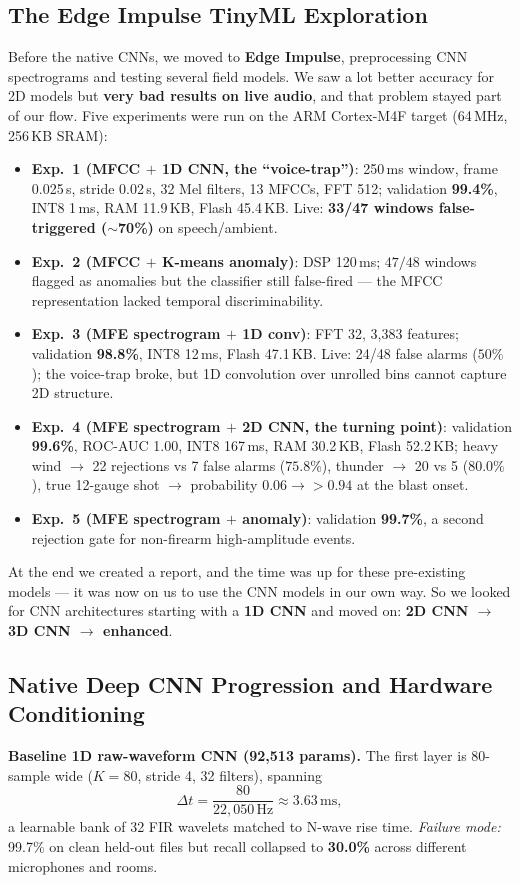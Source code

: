 \documentclass[conference]{IEEEtran}
\begin{document}
\subsection{The Edge Impulse TinyML Exploration}
Before the native CNNs, we moved to \textbf{Edge Impulse}, preprocessing CNN spectrograms and testing
several field models. We saw a lot better accuracy for 2D models but \textbf{very bad results on live
audio}, and that problem stayed part of our flow. Five experiments were run on the ARM Cortex-M4F target
(64\,MHz, 256\,KB SRAM):
\begin{itemize}
    \item \textbf{Exp.~1 (MFCC $+$ 1D CNN, the ``voice-trap'')}: 250\,ms window, frame 0.025\,s, stride
    0.02\,s, 32 Mel filters, 13 MFCCs, FFT 512; validation \textbf{99.4\%}, INT8 1\,ms, RAM 11.9\,KB, Flash
    45.4\,KB. Live: \textbf{33/47 windows false-triggered ($\sim$70\%)} on speech/ambient.
    \item \textbf{Exp.~2 (MFCC $+$ K-means anomaly)}: DSP 120\,ms; $47/48$ windows flagged as anomalies but
    the classifier still false-fired --- the MFCC representation lacked temporal discriminability.
    \item \textbf{Exp.~3 (MFE spectrogram $+$ 1D conv)}: FFT 32, 3{,}383 features; validation
    \textbf{98.8\%}, INT8 12\,ms, Flash 47.1\,KB. Live: 24/48 false alarms ($50\%$); the voice-trap broke,
    but 1D convolution over unrolled bins cannot capture 2D structure.
    \item \textbf{Exp.~4 (MFE spectrogram $+$ 2D CNN, the turning point)}: validation \textbf{99.6\%},
    ROC-AUC 1.00, INT8 167\,ms, RAM 30.2\,KB, Flash 52.2\,KB; heavy wind $\rightarrow$ 22 rejections vs 7
    false alarms ($75.8\%$), thunder $\rightarrow$ 20 vs 5 ($80.0\%$), true 12-gauge shot $\rightarrow$
    probability $0.06 \to >0.94$ at the blast onset.
    \item \textbf{Exp.~5 (MFE spectrogram $+$ anomaly)}: validation \textbf{99.7\%}, a second rejection gate
    for non-firearm high-amplitude events.
\end{itemize}
At the end we created a report, and the time was up for these pre-existing models --- it was now on us to use
the CNN models in our own way. So we looked for CNN architectures starting with a \textbf{1D CNN} and moved
on: \textbf{2D CNN $\rightarrow$ 3D CNN $\rightarrow$ enhanced}.

\subsection{Native Deep CNN Progression and Hardware Conditioning}
\textbf{Baseline 1D raw-waveform CNN (92{,}513 params).} The first layer is 80-sample wide
($K=80$, stride 4, 32 filters), spanning
\begin{equation}
    \Delta t = \frac{80}{22{,}050\,\text{Hz}} \approx 3.63\,\text{ms},
\end{equation}
a learnable bank of 32 FIR wavelets matched to N-wave rise time. \textit{Failure mode:} 99.7\% on clean
held-out files but recall collapsed to \textbf{30.0\%} across different microphones and rooms.
\end{document}
